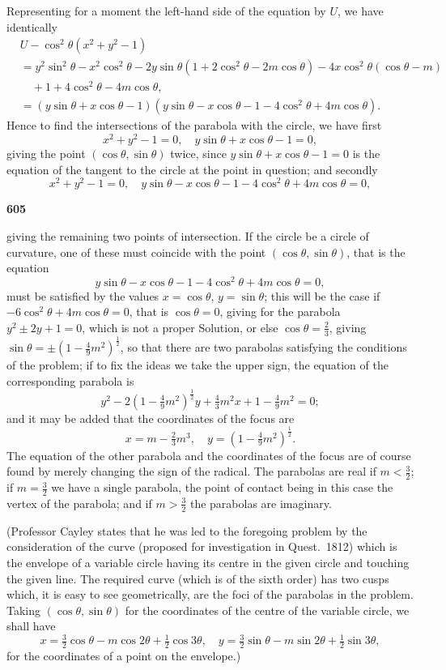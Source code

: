 \documentclass[12pt,a4paper]{article}
\theoremstyle{plain}
\begin{document}
Representing for a moment the left-hand side of the equation by $U$, we have identically
\begin{align*}
&U - \cos^2\theta(x^2+y^2-1)\\
&= y^2\sin^2\theta - x^2\cos^2\theta - 2y\sin\theta(1+2\cos^2\theta-2m\cos\theta) - 4x\cos^2\theta(\cos\theta-m)\\
&\quad + 1 + 4\cos^2\theta - 4m\cos\theta,\\
&= (y\sin\theta+x\cos\theta-1)(y\sin\theta-x\cos\theta-1-4\cos^2\theta+4m\cos\theta).
\end{align*}
Hence to find the intersections of the parabola with the circle, we have first
\[x^2+y^2-1=0,\quad y\sin\theta+x\cos\theta-1=0,\]
giving the point $(\cos\theta,\sin\theta)$ twice, since $y\sin\theta+x\cos\theta-1=0$ is the equation of the tangent to the circle at the point in question; and secondly
\[x^2+y^2-1=0,\quad y\sin\theta-x\cos\theta-1-4\cos^2\theta+4m\cos\theta=0,\]

\newpage
\noindent\textbf{605}

\noindent giving the remaining two points of intersection. If the circle be a circle of curvature, one of these must coincide with the point $(\cos\theta,\sin\theta)$, that is the equation
\[y\sin\theta - x\cos\theta - 1 - 4\cos^2\theta + 4m\cos\theta = 0,\]
must be satisfied by the values $x=\cos\theta$, $y=\sin\theta$; this will be the case if $-6\cos^2\theta+4m\cos\theta=0$, that is $\cos\theta=0$, giving for the parabola $y^2\pm 2y+1=0$, which is not a proper Solution, or else $\cos\theta=\frac{2}{3}$, giving $\sin\theta=\pm(1-\frac{4}{9}m^2)^{\frac{1}{2}}$, so that there are two parabolas satisfying the conditions of the problem; if to fix the ideas we take the upper sign, the equation of the corresponding parabola is
\[y^2 - 2(1-\tfrac{4}{9}m^2)^{\frac{1}{2}}y + \tfrac{4}{3}m^2x + 1 - \tfrac{4}{9}m^2 = 0;\]
and it may be added that the coordinates of the focus are
\[x = m - \tfrac{2}{3}m^3,\quad y = (1-\tfrac{4}{9}m^2)^{\frac{1}{2}}.\]
The equation of the other parabola and the coordinates of the focus are of course found by merely changing the sign of the radical. The parabolas are real if $m<\frac{3}{2}$; if $m=\frac{3}{2}$ we have a single parabola, the point of contact being in this case the vertex of the parabola; and if $m>\frac{3}{2}$ the parabolas are imaginary.

(Professor Cayley states that he was led to the foregoing problem by the consideration of the curve (proposed for investigation in Quest.~1812) which is the envelope of a variable circle having its centre in the given circle and touching the given line. The required curve (which is of the sixth order) has two cusps which, it is easy to see geometrically, are the foci of the parabolas in the problem. Taking $(\cos\theta,\sin\theta)$ for the coordinates of the centre of the variable circle, we shall have
\[x = \tfrac{3}{2}\cos\theta - m\cos 2\theta + \tfrac{1}{2}\cos 3\theta,\quad y = \tfrac{3}{2}\sin\theta - m\sin 2\theta + \tfrac{1}{2}\sin 3\theta,\]
for the coordinates of a point on the envelope.)
\end{document}
